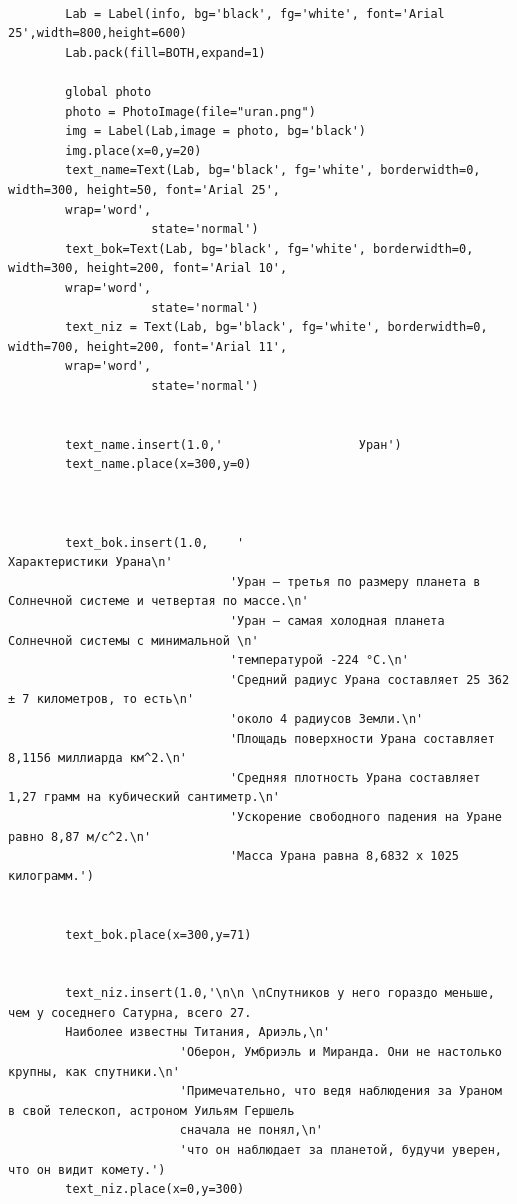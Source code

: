 \documentclass[11pt,a4paper]{report}
\begin{document}
\begin{verbatim}
        
        Lab = Label(info, bg='black', fg='white', font='Arial 25',width=800,height=600)  
        Lab.pack(fill=BOTH,expand=1)
        
        global photo
        photo = PhotoImage(file="uran.png")
        img = Label(Lab,image = photo, bg='black')
        img.place(x=0,y=20)
        text_name=Text(Lab, bg='black', fg='white', borderwidth=0, width=300, height=50, font='Arial 25', 
        wrap='word',
                    state='normal') 
        text_bok=Text(Lab, bg='black', fg='white', borderwidth=0, width=300, height=200, font='Arial 10', 
        wrap='word',
                    state='normal')  
        text_niz = Text(Lab, bg='black', fg='white', borderwidth=0, width=700, height=200, font='Arial 11', 
        wrap='word',
                    state='normal')  
    
       
        text_name.insert(1.0,'                   Уран')
        text_name.place(x=300,y=0)
        
        
        
        text_bok.insert(1.0,    '                                           Характеристики Урана\n' 
                               'Уран – третья по размеру планета в Солнечной системе и четвертая по массе.\n'
                               'Уран – самая холодная планета Солнечной системы с минимальной \n'
                               'температурой -224 °C.\n'
                               'Средний радиус Урана составляет 25 362 ± 7 километров, то есть\n'
                               'около 4 радиусов Земли.\n'
                               'Площадь поверхности Урана составляет 8,1156 миллиарда км^2.\n'
                               'Средняя плотность Урана составляет 1,27 грамм на кубический сантиметр.\n'
                               'Ускорение свободного падения на Уране равно 8,87 м/c^2.\n'
                               'Масса Урана равна 8,6832 х 1025 килограмм.')
        
        
        text_bok.place(x=300,y=71)        
        
        
        text_niz.insert(1.0,'\n\n \nСпутников у него гораздо меньше, чем у соседнего Сатурна, всего 27. 
        Наиболее известны Титания, Ариэль,\n'
                        'Оберон, Умбриэль и Миранда. Они не настолько крупны, как спутники.\n'
                        'Примечательно, что ведя наблюдения за Ураном в свой телескоп, астроном Уильям Гершель 
                        сначала не понял,\n'
                        'что он наблюдает за планетой, будучи уверен, что он видит комету.')
        text_niz.place(x=0,y=300) 
        

\end{verbatim}
\end{document}
